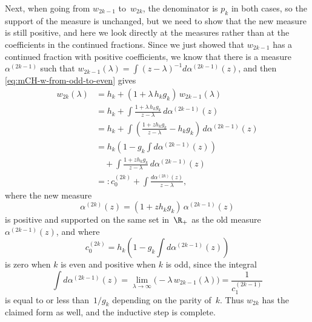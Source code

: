 \documentclass[10pt,a4paper]{article} \pdfoutput=1 
\begin{document}
Next, when going from $w_{2k-1}$ to~$w_{2k}$,
the denominator is $p_k$ in both cases, so the support of the measure is unchanged,
but we need to show that the new measure is still positive,
and here we look directly at the measures rather than at the coefficients in the continued fractions.
Since we just showed that $w_{2k-1}$ has a continued fraction with positive coefficients,
we know that there is a measure $\alpha^{(2k-1)}$ such that
$w_{2k-1}(\lambda) = \int (z-\lambda)^{-1} d\alpha^{(2k-1)}(z)$,
and then \eqref{eq:mCH-w-from-odd-to-even} gives
\begin{equation*}
  \begin{split}
    w_{2k}(\lambda)
    &
    = h_k + (1 + \lambda \, h_k g_k) \, w_{2k-1}(\lambda)
    \\ &
    = h_k + \int \frac{1 + \lambda \, h_k g_k}{z-\lambda} \, d\alpha^{(2k-1)}(z)
    \\ &
    = h_k + \int \left( \frac{1 + z h_k g_k}{z-\lambda} - h_k g_k  \right) \, d\alpha^{(2k-1)}(z)
    \\ &
    = h_k \left( 1 - g_k \int d\alpha^{(2k-1)}(z) \right)
    \\ & \quad
    + \int \frac{1 + z h_k g_k}{z-\lambda}  \, d\alpha^{(2k-1)}(z)
    \\ &
    =: c_0^{(2k)} + \int \frac{d\alpha^{(2k)}(z)}{z-\lambda}
    ,
  \end{split}
\end{equation*}
where the new measure
\begin{equation*}
  \alpha^{(2k)}(z) = (1 + z h_k g_k) \, \alpha^{(2k-1)}(z)
\end{equation*}
is positive and supported on the same set in~$\R_+$ as the old measure~$\alpha^{(2k-1)}(z)$,
and where
\begin{equation*}
  c_0^{(2k)} = h_k \left( 1 - g_k \int d\alpha^{(2k-1)}(z) \right)
\end{equation*}
is zero when $k$ is even and positive when $k$ is odd,
since the integral
\begin{equation*}
  \int d\alpha^{(2k-1)}(z)
  = \lim_{\lambda \to \infty} \bigl( -\lambda \, w_{2k-1}(\lambda) \bigr)
  = \frac{1}{c_1^{(2k-1)}}
\end{equation*}
is equal to or less than~$1/g_k$ depending on the parity of~$k$.
Thus $w_{2k}$ has the claimed form as well, and the inductive step is complete.
\end{document}

